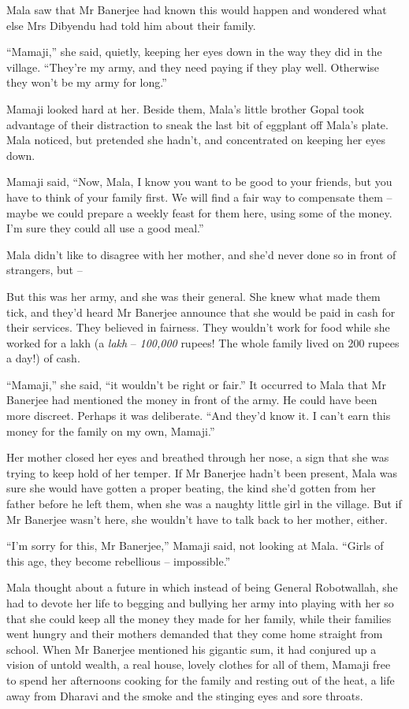 Mala saw that Mr Banerjee had known this would happen and wondered
what else Mrs Dibyendu had told him about their family.

``Mamaji,'' she said, quietly, keeping her eyes down in the way they
did in the village. ``They're my army, and they need paying if they
play well. Otherwise they won't be my army for long.''

Mamaji looked hard at her. Beside them, Mala's little brother Gopal
took advantage of their distraction to sneak the last bit of
eggplant off Mala's plate. Mala noticed, but pretended she hadn't,
and concentrated on keeping her eyes down.

Mamaji said, ``Now, Mala, I know you want to be good to your
friends, but you have to think of your family first. We will find a
fair way to compensate them -- maybe we could prepare a weekly
feast for them here, using some of the money. I'm sure they could
all use a good meal.''

Mala didn't like to disagree with her mother, and she'd never done
so in front of strangers, but --

But this was her army, and she was their general. She knew what
made them tick, and they'd heard Mr Banerjee announce that she
would be paid in cash for their services. They believed in
fairness. They wouldn't work for food while she worked for a lakh
(a \emph{lakh} -- \emph{100,000} rupees! The whole family lived on
200 rupees a day!) of cash.

``Mamaji,'' she said, ``it wouldn't be right or fair.'' It occurred to
Mala that Mr Banerjee had mentioned the money in front of the army.
He could have been more discreet. Perhaps it was deliberate. ``And
they'd know it. I can't earn this money for the family on my own,
Mamaji.''

Her mother closed her eyes and breathed through her nose, a sign
that she was trying to keep hold of her temper. If Mr Banerjee
hadn't been present, Mala was sure she would have gotten a proper
beating, the kind she'd gotten from her father before he left them,
when she was a naughty little girl in the village. But if Mr
Banerjee wasn't here, she wouldn't have to talk back to her mother,
either.

``I'm sorry for this, Mr Banerjee,'' Mamaji said, not looking at
Mala. ``Girls of this age, they become rebellious -- impossible.''

Mala thought about a future in which instead of being General
Robotwallah, she had to devote her life to begging and bullying her
army into playing with her so that she could keep all the money
they made for her family, while their families went hungry and
their mothers demanded that they come home straight from school.
When Mr Banerjee mentioned his gigantic sum, it had conjured up a
vision of untold wealth, a real house, lovely clothes for all of
them, Mamaji free to spend her afternoons cooking for the family
and resting out of the heat, a life away from Dharavi and the smoke
and the stinging eyes and sore throats.

